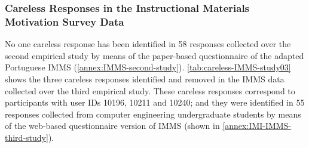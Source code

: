 
\subsubsection*{Careless Responses in the Instructional Materials Motivation Survey Data}

No one careless response has been identified in 58 responses collected over the second empirical study by means of the paper-based questionnaire of the adapted Portuguese IMMS (\autoref{annex:IMMS-second-study}). \autoref{tab:careless-IMMS-study03} shows the three careless responses identified and removed in the IMMS data collected over the third empirical study. These careless responses correspond to participants with user IDs 10196, 10211 and 10240; and they were identified in 55 responses collected from computer engineering undergraduate students by means of the web-based questionnaire version of IMMS (shown in \autoref{annex:IMI-IMMS-third-study}).

